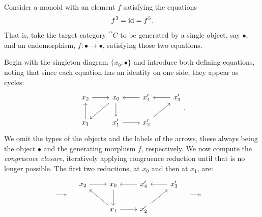 \documentclass[11pt]{article}
\numberwithin{equation}{section}
\begin{document}
\begin{example}
  \label{ex:monoid-presentation}
  Consider a monoid with an element $f$ satisfying the equations
  \begin{equation*}
    f^3 = \operatorname{id} = f^5.
  \end{equation*}
  That is, take the target category $\cat{C}$ to be generated by a single
  object, say $\bullet$, and an endomorphism, $f: \bullet \to \bullet$, satisfying those two
  equations.

  Begin with the singleton diagram $\{x_0: \bullet\}$ and introduce both defining
  equations, noting that since each equation has an identity on one side, they
  appear as cycles:
  \begin{equation*}
    \begin{tikzcd}
      {x_2} & {x_0} & {x_4'} & {x_3'} \\
      {x_1} & {x_1'} & {x_2'}
      \arrow[from=1-1, to=1-2]
      \arrow[from=1-2, to=2-1]
      \arrow[from=1-2, to=2-2]
      \arrow[from=1-3, to=1-2]
      \arrow[from=1-4, to=1-3]
      \arrow[from=2-1, to=1-1]
      \arrow[from=2-2, to=2-3]
      \arrow[from=2-3, to=1-4]
    \end{tikzcd}.
  \end{equation*}
  We omit the types of the objects and the labels of the arrows, these always
  being the object $\bullet$ and the generating morphism $f$, respectively. We now
  compute the \emph{congruence closure}, iteratively applying congruence
  reduction until that is no longer possible. The first two reductions, at $x_0$
  and then at $x_1$, are:
  \begin{equation*}
    \longinitialto\quad
    \begin{tikzcd}
      {x_2} & {x_0} & {x_4'} & {x_3'} \\
      & {x_1} & {x_2'}
      \arrow[from=1-1, to=1-2]
      \arrow[from=1-2, to=2-2]
      \arrow[from=1-3, to=1-2]
      \arrow[from=1-4, to=1-3]
      \arrow[from=2-2, to=1-1]
      \arrow[from=2-2, to=2-3]
      \arrow[from=2-3, to=1-4]
    \end{tikzcd}
    \quad\longinitialto\quad

\end{equation*}
\end{example}
\end{document}
